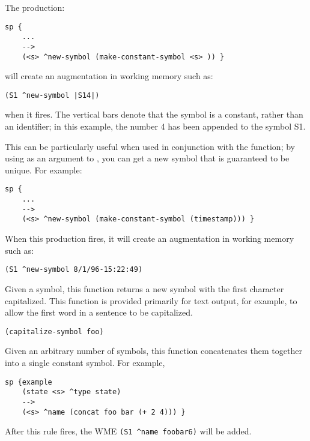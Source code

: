 \begin{description}
        The production:

\begin{verbatim}
sp {
    ...
    -->
    (<s> ^new-symbol (make-constant-symbol <s> )) }
\end{verbatim}
        
        will create an augmentation in working memory such as:
\begin{verbatim}
(S1 ^new-symbol |S14|)
\end{verbatim}

        when it fires. The vertical bars denote that the symbol is a
        constant, rather than an identifier; in this example, the number 4 has
        been appended to the symbol S1.

        This can be particularly useful when used in conjunction with the
         function; by using  as an argument to
        , you can get a new symbol that is
        guaranteed to be unique. For example:

\begin{verbatim}
sp {
    ...
    -->
    (<s> ^new-symbol (make-constant-symbol (timestamp))) }
\end{verbatim}

        When this production fires, it will create an augmentation in working
        memory such as:

\begin{verbatim}
(S1 ^new-symbol 8/1/96-15:22:49)
\end{verbatim}    


\item [\soarb{capitalize-symbol} --- ] Given a symbol, this function returns a
	new symbol with the first character capitalized. This function is
	provided primarily for text output, for example, to allow the first
        word in a sentence to be capitalized.


\begin{verbatim}
(capitalize-symbol foo)
\end{verbatim}    

\item [\soarb{concat} --- ] Given an arbitrary number of symbols, this function
        concatenates them together into a single constant symbol. For example,

\begin{verbatim}
sp {example
    (state <s> ^type state)
    -->
    (<s> ^name (concat foo bar (+ 2 4))) }
\end{verbatim}

       After this rule fires, the WME \verb=(S1 ^name foobar6)= will be added.

\end{description}


